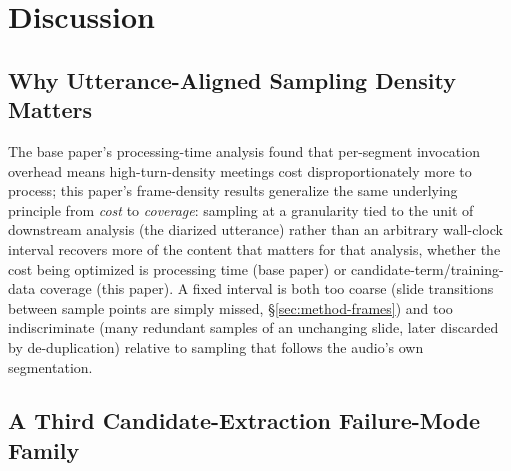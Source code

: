 ﻿\documentclass[twocolumn]{article}
\begin{document}
\section{Discussion}
\label{sec:discussion}

\subsection{Why Utterance-Aligned Sampling Density Matters}

The base paper's processing-time analysis found that per-segment invocation overhead means
high-turn-density meetings cost disproportionately more to process; this paper's frame-density
results generalize the same underlying principle from \emph{cost} to \emph{coverage}: sampling at a
granularity tied to the unit of downstream analysis (the diarized utterance) rather than an
arbitrary wall-clock interval recovers more of the content that matters for that analysis, whether
the cost being optimized is processing time (base paper) or candidate-term/training-data coverage
(this paper). A fixed interval is both too coarse (slide transitions between sample points are
simply missed, \S\ref{sec:method-frames}) and too indiscriminate (many redundant samples of an
unchanging slide, later discarded by de-duplication) relative to sampling that follows the audio's
own segmentation.

\subsection{A Third Candidate-Extraction Failure-Mode Family}
\label{sec:discuss-ocr}
\end{document}

